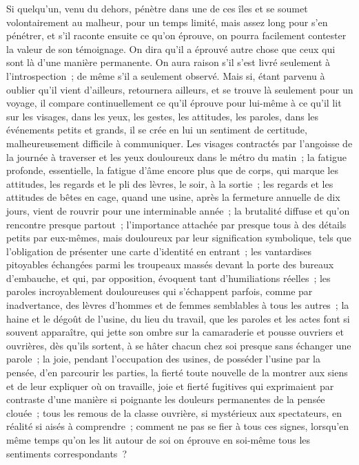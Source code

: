 \documentclass[french,twoside]{book} %
\begin{document}
Si quelqu'un, venu du dehors, pénètre dans une de ces îles et se soumet volontairement au malheur, pour un temps limité, mais assez long pour s'en pénétrer, et s'il raconte ensuite ce qu’on éprouve, on pourra facilement contester la valeur de son témoignage. On dira qu'il a éprouvé autre chose que ceux qui sont là d'une manière permanente. On aura raison s'il s'est livré seulement à l'introspection ; de même s'il a seulement observé. Mais si, étant parvenu à oublier qu'il vient d'ailleurs, retournera ailleurs, et se trouve là seulement pour un voyage, il compare continuellement ce qu'il éprouve pour lui-même à ce qu'il lit sur les visages, dans les yeux, les gestes, les attitudes, les paroles, dans les événements petits et grands, il se crée en lui un sentiment de certitude, malheureusement difficile à communiquer. Les visages contractés par l'angoisse de la journée à traverser et les yeux douloureux dans le métro du matin ; la fatigue profonde, essentielle, la fatigue d'âme encore plus que de corps, qui marque les attitudes, les regards et le pli des lèvres, le soir, à la sortie ; les regards et les attitudes de bêtes en cage, quand une usine, après la fermeture annuelle de dix jours, vient de rouvrir pour une interminable année ; la brutalité diffuse et qu'on rencontre presque partout ; l'importance attachée par presque tous à des détails petits par eux-mêmes, mais douloureux par leur signification symbolique, tels que l'obligation de présenter une carte d'identité en entrant ; les vantardises pitoyables échangées parmi les troupeaux massés devant la porte des bureaux d'embauche, et qui, par opposition, évoquent tant d'humiliations réelles ; les paroles incroyablement douloureuses qui s'échappent parfois, comme par inadvertance, des lèvres d'hommes et de femmes semblables à tous les autres ; la haine et le dégoût de l'usine, du lieu du travail, que les paroles et les actes font si souvent apparaître, qui jette son ombre sur la camaraderie et pousse ouvriers et ouvrières, dès qu'ils sortent, à se hâter chacun chez soi presque sans échanger une parole ; la joie, pendant l'occupation des usines, de posséder l'usine par la pensée, d'en parcourir les parties, la fierté toute nouvelle de la montrer aux siens et de leur expliquer où on travaille, joie et fierté fugitives qui exprimaient par contraste d'une manière si poignante les douleurs permanentes de la pensée clouée ; tous les remous de la classe ouvrière, si mystérieux aux spectateurs, en réalité si aisés à comprendre ; comment ne pas se fier à tous ces signes, lorsqu'en même temps qu’on les lit autour de soi on éprouve en soi-même tous les sentiments correspondants ?\par
\end{document}
